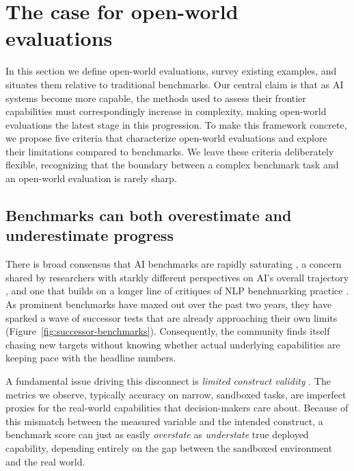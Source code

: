 \documentclass{article}
\begin{document}
\section{The case for open-world evaluations}\label{open-world-evaluations-are-an-important-emerging-class-of-ai-evaluation}

In this section we define open-world evaluations, survey existing examples, and situates them relative to traditional benchmarks. Our central claim is that as AI systems become more capable, the methods used to assess their frontier capabilities must correspondingly increase in complexity, making open-world evaluations the latest stage in this progression. To make this framework concrete, we propose five criteria that characterize open-world evaluations and explore their limitations compared to benchmarks. We leave these criteria deliberately flexible, recognizing that the boundary between a complex benchmark task and an open-world evaluation is rarely sharp.

\subsection{Benchmarks can both overestimate and underestimate progress}\label{benchmarks-can-both-overestimate-and-underestimate-progress}

There is broad consensus that AI benchmarks are rapidly saturating \citep{redAnthropicCom2026}, a concern shared by researchers with starkly different perspectives on AI's overall trajectory \citep{asteriskmagSubstackComP}, and one that builds on a longer line of critiques of NLP benchmarking practice \citep{kiela2021dynabench,liang2023helm}. As prominent benchmarks have maxed out over the past two years, they have sparked a wave of successor tests that are already approaching their own limits (Figure~\ref{fig:successor-benchmarks}). Consequently, the community finds itself chasing new targets without knowing whether actual underlying capabilities are keeping pace with the headline numbers.

A fundamental issue driving this disconnect is \emph{limited construct validity} \citep{jacobsWallach2021,raji2021everything}. The metrics we observe, typically accuracy on narrow, sandboxed tasks, are imperfect proxies for the real-world capabilities that decision-makers care about. Because of this mismatch between the measured variable and the intended construct, a benchmark score can just as easily \emph{overstate} as \emph{understate} true deployed capability, depending entirely on the gap between the sandboxed environment and the real world.
\end{document}
